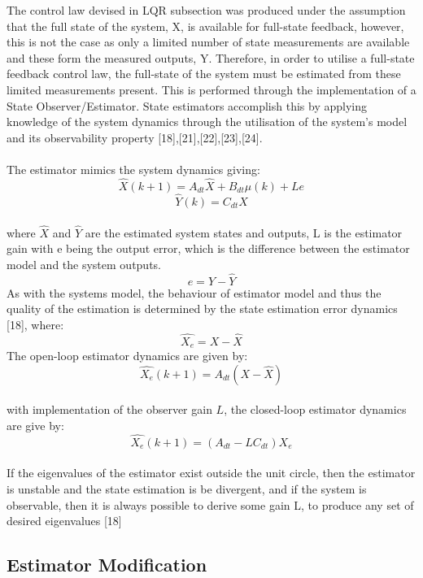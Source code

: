 \documentclass[12pt,a4paper,twoside]{report}
\begin{document}
				The control law devised in LQR subsection was produced under the assumption that the full state of the system, X, is available for full-state feedback, however, this is not the case as only a limited number of state measurements are available and these form the measured outputs, Y. Therefore, in order to utilise a full-state feedback control law, the full-state of the system must be estimated from these limited measurements present. This is performed through the implementation of a State Observer/Estimator. State estimators accomplish this by applying knowledge of the system dynamics through the utilisation of the system's model and its observability property [18],[21],[22],[23],[24].
				\\ \\
				The estimator mimics the system dynamics giving: 
				\[
					\hat{X}(k+1) = A_{dt}\hat{X} + B_{dt} \mu(k) + L e
				\]
				\begin{equation}
					\hat{Y}(k) = C_{dt}\hat{X}
				\end{equation}
				\\
				where $\hat{X}$ and $\hat{Y}$ are the estimated system states and outputs, L is the estimator gain with e being the output error, which is the difference between the estimator model and the system outputs.
				\[
					e = Y - \hat{Y}
				\]
				As with the systems model, the behaviour of estimator model and thus the quality of the estimation is determined by the state estimation error dynamics [18], where:
				\[
					\hat{X_e} = X - \hat{X}
				\]
				The open-loop estimator dynamics are given by:
				\begin{equation}
					\hat{X_e}(k+1) = A_{dt}(X - \hat{X})
				\end{equation}
				\\
				with implementation of the observer gain $L$, the closed-loop estimator dynamics are give by:
				\begin{equation}
					\hat{X_e}(k+1) = (A_{dt} - L C_{dt})\hat{X_e}
				\end{equation}
				\\
				If the eigenvalues of the estimator exist outside the unit circle, then the estimator is unstable and the state estimation is be divergent, and if the system is observable, then it is always possible to derive some gain L, to produce any set of desired eigenvalues [18] 
				\\
			\subsection{Estimator Modification}
			
\end{document}
